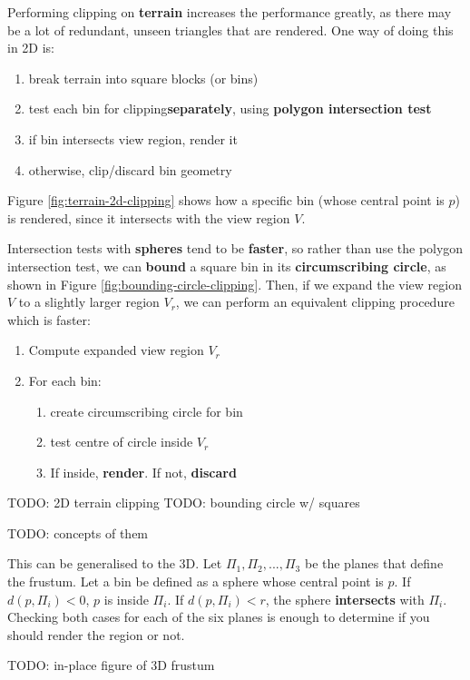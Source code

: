 \documentclass{article}
\begin{document}
Performing clipping on \textbf{terrain} increases the performance greatly, as there may be a lot of redundant, unseen triangles that are rendered. One way of doing this in 2D is:
\begin{enumerate}
	\item break terrain into square blocks (or bins)
	\item test each bin for clipping\textbf{separately}, using \textbf{polygon intersection test}
	\item if bin intersects view region, render it
	\item otherwise, clip/discard bin geometry
\end{enumerate}
Figure \ref{fig:terrain-2d-clipping} shows how a specific bin (whose central point is $p$) is rendered, since it intersects with the view region $V$.

Intersection tests with \textbf{spheres} tend to be \textbf{faster}, so rather than use the polygon intersection test, we can \textbf{bound} a square bin in its \textbf{circumscribing circle}, as shown in Figure \ref{fig:bounding-circle-clipping}. Then, if we expand the view region $V$ to a slightly larger region $V_r$, we can perform an equivalent clipping procedure which is faster:
\begin{enumerate}
	\item Compute expanded view region $V_r$
	\item For each bin:
	\begin{enumerate}
		\item create circumscribing circle for bin
		\item test centre of circle inside $V_r$
		\item If inside, \textbf{render}. If not, \textbf{discard}
	\end{enumerate}
\end{enumerate}

TODO: 2D terrain clipping
TODO: bounding circle w/ squares

TODO: concepts of them

This can be generalised to the 3D. Let $\Pi_1, \Pi_2, ..., \Pi_3$ be the planes that define the frustum. Let a bin be defined as a sphere whose central point is $p$. If $d(p, \Pi_i) < 0$, $p$ is inside $\Pi_i$. If $d(p, \Pi_i) < r$, the sphere \textbf{intersects} with $\Pi_i$. Checking both cases for each of the six planes is enough to determine if you should render the region or not.

TODO: in-place figure of 3D frustum
\end{document}
